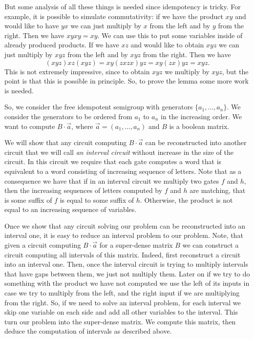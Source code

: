 \documentclass[11pt,letterpaper]{article}
\begin{document}
But some analysis of all these things is needed since idempotency is tricky. For example, it is possible to simulate commutativity: if we have the product $xy$ and would like to have $yx$ we can just multiply by $x$ from the left and by $y$ from the right. Then we have $xyxy=xy$. We can use this to put some variables inside of already produced products. If we have $xz$ and would like to obtain $xyz$ we can just multiply by $xyz$ from the left and by $xyz$ from the right. Then we have
$$
(xyz)xz(xyz)=xy(zxzx)yz=xy(zx)yz=xyz.
$$
This is not extremely impressive, since to obtain $xyz$ we multiply by $xyz$, but the point is that this is possible in principle. So, to prove the lemma some more work is needed.


So, we consider the free idempotent semigroup with generators $\{a_1,\ldots, a_n\}$.
We consider the generators to be ordered from $a_1$ to $a_n$ in the increasing order. We want to compute $B \cdot \vec{a}$, where $\vec{a}=(a_1,\ldots, a_n)$ and $B$ is a boolean matrix.

We will show that any circuit computing $B \cdot \vec{a}$ can be reconstructed into another circuit that we will call \emph{an interval circuit} without increase in the size of the circuit. In this circuit we require that each gate computes a word that is equivalent to a word consisting of increasing sequence of letters. Note that as a consequence we have that if in an interval circuit we multiply two gates $f$ and $h$, then the increasing sequences of letters computed by $f$ and $h$ are matching, that is some suffix of $f$ is equal to some suffix of $h$. Otherwise, the product is not equal to an increasing sequence of variables.

Once we show that any circuit solving our problem can be reconstructed into an interval one, it is easy to reduce an interval problem to our problem. Note, that given a circuit computing $B \cdot \vec{a}$ for a super-dense matrix $B$ we can construct a circuit computing all intervals of this matrix. Indeed, first reconstruct a circuit into an interval one. Then, once the interval circuit is trying to multiply intervals that have gaps  between them, we just not multiply them. Later on if we try to do something with the product we have not computed we use the left of its inputs in case we try to multiply from the left, and the right input if we are multiplying from the right. So, if we need to solve an interval problem, for each interval we skip one variable on each side and add all other variables to the interval. This turn our problem into the super-dense matrix. We compute this matrix, then deduce the computation of intervals as described above.
\end{document}
